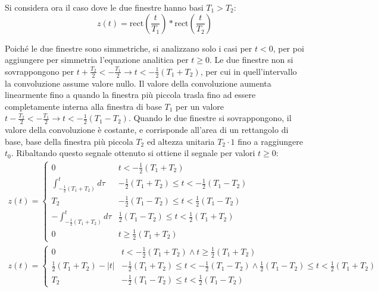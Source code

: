 \documentclass{article}
\numberwithin{equation}{subsection}
\begin{document}
Si considera ora il caso dove le due finestre hanno basi $T_1>T_2$:
\begin{equation*}
    z(t)=\mbox{rect}\left(\displaystyle\frac{t}{T_1}\right)*\mbox{rect}\left(\frac{t}{T_2}\right)
\end{equation*}

Poiché le due finestre sono simmetriche, si analizzano solo i casi per $t<0$, per poi aggiungere per simmetria l'equazione analitica per $t\geq0$. Le due finestre non si 
sovrappongono per $t+\displaystyle\frac{T_2}{2}<-\frac{T_1}{2}\to t<-\frac{1}{2}(T_1+T_2)$, per cui in quell'intervallo la convoluzione assume valore nullo. Il valore 
della convoluzione aumenta linearmente fino a quando la finestra più piccola trasla fino ad essere completamente interna alla finestra di base $T_1$ per un valore 
$t-\displaystyle\frac{T_2}{2}<-\frac{T_1}{2}\to t<-\frac{1}{2}(T_1-T_2)$. Quando le due finestre si sovrappongono, il valore della convoluzione è costante, e corrisponde 
all'area di un rettangolo di base, base della finestra più piccola $T_2$ ed altezza unitaria $T_2\cdot1$ fino a raggiungere $t_0$. Ribaltando questo segnale ottenuto 
si ottiene il segnale per valori $t\geq0$:
\begin{gather*}
    z(t)=\begin{cases}
        0&t<-\displaystyle\frac{1}{2}(T_1+T_2)\\
        \displaystyle\int_{-\frac{1}{2}(T_1+T_2)}^td\tau&-\frac{1}{2}(T_1+T_2)\leq t <-\frac{1}{2}(T_1-T_2)\\
        T_2&-\frac{1}{2}(T_1-T_2)\leq t<\frac{1}{2}(T_1-T_2)\\
        -\displaystyle\int_{-\frac{1}{2}(T_1+T_2)}^td\tau&\frac{1}{2}(T_1-T_2)\leq t <\frac{1}{2}(T_1+T_2)\\
        0&t\geq\displaystyle\frac{1}{2}(T_1+T_2)
    \end{cases}\\
    z(t)=\begin{cases}
        0&t<-\displaystyle\frac{1}{2}(T_1+T_2)\land t\geq\frac{1}{2}(T_1+T_2)\\
        \displaystyle\frac{1}{2}(T_1+T_2)-|t| &-\frac{1}{2}(T_1+T_2)\leq t <-\frac{1}{2}(T_1-T_2)\land \frac{1}{2}(T_1-T_2)\leq t <\frac{1}{2}(T_1+T_2)\\
        T_2&-\displaystyle\frac{1}{2}(T_1-T_2)\leq t<\frac{1}{2}(T_1-T_2)
    \end{cases}
\end{gather*}
\end{document}
